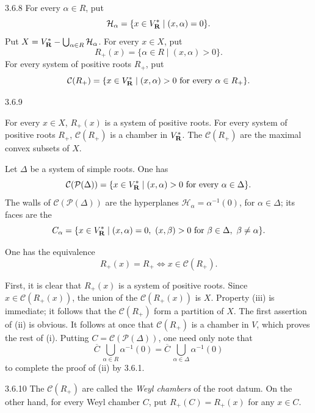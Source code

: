 \begin{definition}{3.6.8}\label{XXI.3.6.8}
{\renewcommand{\thefootnote}{(15)}}%
For every $\alpha\in R$, put
\[
\mathcal H_\alpha=\{x\in V_{\mathbf{R}}^*\mid(x,\alpha)=0\}.
\]
Put $X=V_{\mathbf{R}}^*-\bigcup_{\alpha\in R}\mathcal H_\alpha$. For every $x\in X$, put
\[
R_+(x)=\{\alpha\in R\mid(x,\alpha)>0\}.
\]
For every system of positive roots $R_+$, put
\[
\mathcal C(R_+)=\{x\in V_{\mathbf{R}}^*\mid(x,\alpha)>0\text{ for every }\alpha\in R_+\}.
\]
\end{definition}
\begin{proposition}{3.6.9}\label{XXI.3.6.9}
\begin{enumeratei}
\item For every $x\in X$, $R_+(x)$ is a system of positive roots. For every system of positive roots $R_+$, $\mathcal C(R_+)$ is a chamber in $V_{\mathbf{R}}^*$. The $\mathcal C(R_+)$ are the maximal convex subsets of $X$.
\item Let $\Delta$ be a system of simple roots. One has
\[
\mathcal C(\mathcal P(\Delta))=\{x\in V_{\mathbf{R}}^*\mid(x,\alpha)>0\text{ for every }\alpha\in\Delta\}.
\]
The walls of $\mathcal C(\mathcal P(\Delta))$ are the hyperplanes $\mathcal H_\alpha=\alpha^{-1}(0)$, for $\alpha\in\Delta$; its faces are the
\[
C_\alpha=\{x\in V_\RR^*\mid(x,\alpha)=0,\ (x,\beta)>0\text{ for }\beta\in\Delta,\ \beta\ne\alpha\}.
\]
\item One has the equivalence
\[
R_+(x)=R_+\Longleftrightarrow x\in\mathcal C(R_+).
\]
\end{enumeratei}
\end{proposition}
First, it is clear that $R_+(x)$ is a system of positive roots. Since $x\in\mathcal C(R_+(x))$, the union of the $\mathcal C(R_+(x))$ is $X$. Property (iii) is immediate; it follows that the $\mathcal C(R_+)$ form a partition of $X$. The first assertion of (ii) is obvious. It follows at once that $\mathcal C(R_+)$ is a chamber in $V$, which proves the rest of (i). Putting $C=\mathcal C(\mathcal P(\Delta))$, one need only note that
\[
\overline C\,\bigcup_{\alpha\in R}\alpha^{-1}(0)=\overline C\,\bigcup_{\alpha\in\Delta}\alpha^{-1}(0)
\]
to complete the proof of (ii) by 3.6.1.
\begin{definition}{3.6.10}\label{XXI.3.6.10}
The $\mathcal C(R_+)$ are called the \emph{Weyl chambers} of the root datum. On the other hand, for every Weyl chamber $C$, put $R_+(C)=R_+(x)$ for any $x\in C$.
\end{definition}
